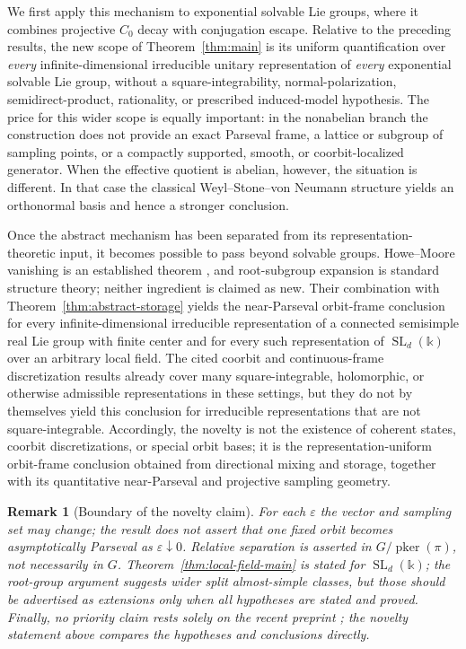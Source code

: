 \documentclass[10pt,a4paper]{amsart}
\numberwithin{equation}{section}
\newtheorem{remark}[theorem]{Remark}
\newcommand{\pker}{\operatorname{pker}}
\begin{document}
We first apply this mechanism to exponential solvable Lie groups, where it
combines projective $C_0$ decay with conjugation escape.  Relative to the
preceding results, the
new scope of Theorem~\ref{thm:main} is its uniform quantification over
\emph{every} infinite-dimensional irreducible unitary representation of
\emph{every} exponential solvable Lie group, without a square-integrability,
normal-polarization, semidirect-product, rationality, or prescribed
induced-model hypothesis.  The price for this wider scope is equally
important: in the nonabelian branch the construction does not provide an
exact Parseval frame, a lattice or subgroup of sampling points, or a compactly
supported, smooth, or coorbit-localized generator.  When the effective
quotient is abelian, however, the situation is different.  In that case the
classical Weyl--Stone--von Neumann structure yields an orthonormal basis and
hence a stronger conclusion.

Once the abstract mechanism has been separated from its
representation-theoretic input, it becomes possible to pass beyond solvable
groups.
Howe--Moore vanishing is an established theorem
\cite{HoweMoore1979,Ciobotaru2014}, and root-subgroup expansion is standard
structure theory; neither ingredient is claimed as new.  Their combination
with Theorem~\ref{thm:abstract-storage} yields the near-Parseval orbit-frame
conclusion for every infinite-dimensional irreducible representation of a
connected semisimple real Lie group with finite center and for every such
representation of $\operatorname{SL}_d(\mathbb k)$ over an arbitrary local
field.  The cited coorbit and continuous-frame discretization results already
cover many square-integrable, holomorphic, or otherwise admissible
representations in these settings, but they do not by themselves yield this
conclusion for irreducible representations that are not square-integrable.
Accordingly, the novelty is not the existence of coherent states, coorbit
discretizations, or special orbit bases; it is the representation-uniform
orbit-frame conclusion obtained from directional mixing and storage,
together with its quantitative near-Parseval and projective sampling geometry.

\begin{remark}[Boundary of the novelty claim]
For each $\varepsilon$ the vector and sampling set may change; the result does
not assert that one fixed orbit becomes asymptotically Parseval as
$\varepsilon\downarrow0$.  Relative separation is asserted in
$G/\pker(\pi)$, not necessarily in $G$.
Theorem~\ref{thm:local-field-main} is stated for
$\operatorname{SL}_d(\mathbb k)$; the root-group argument suggests wider
split almost-simple classes, but those should be advertised as extensions
only when all hypotheses are stated and proved.  Finally, no priority claim
rests solely on the recent preprint \cite{Oussa2026}; the novelty statement
above compares the hypotheses and conclusions directly.
\end{remark}
\end{document}
